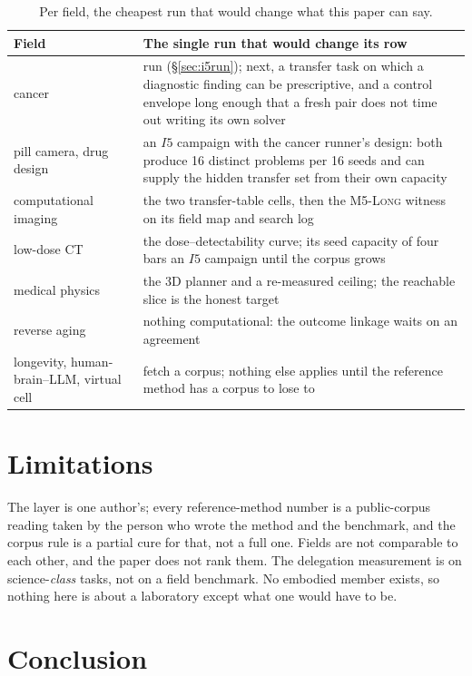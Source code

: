 \begin{table}[!htbp]
\centering\small
\begin{tabularx}{\textwidth}{@{}lY@{}}
\toprule
Field & The single run that would change its row \\
\midrule
cancer & run (\S\ref{sec:i5run}); next, a transfer task on which a diagnostic finding can be prescriptive, and a control envelope long enough that a fresh pair does not time out writing its own solver \\
pill camera, drug design & an $I5$ campaign with the cancer runner's design: both produce 16 distinct problems per 16 seeds and can supply the hidden transfer set from their own capacity \\
computational imaging & the two transfer-table cells, then the \textsc{M5-Long} witness on its field map and search log \\
low-dose CT & the dose--detectability curve; its seed capacity of four bars an $I5$ campaign until the corpus grows \\
medical physics & the 3D planner and a re-measured ceiling; the reachable slice is the honest target \\
reverse aging & nothing computational: the outcome linkage waits on an agreement \\
longevity, human-brain--LLM, virtual cell & fetch a corpus; nothing else applies until the reference method has a corpus to lose to \\
\bottomrule
\end{tabularx}
\caption{Per field, the cheapest run that would change what this paper can say.}
\label{tab:next}
\end{table}

\section{Limitations}\label{sec:limits}

The layer is one author's; every reference-method number is a public-corpus reading taken by the person who wrote the method and the benchmark, and the corpus rule is a partial cure for that, not a full one. Fields are not comparable to each other, and the paper does not rank them. The delegation measurement is on science-\emph{class} tasks, not on a field benchmark. No embodied member exists, so nothing here is about a laboratory except what one would have to be.

\section{Conclusion}

